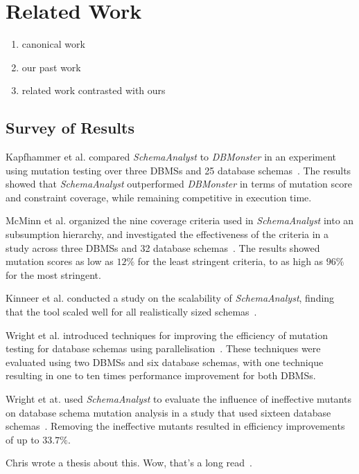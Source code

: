 \section{Related Work}
\begin{enumerate}
\item canonical work
\item our past work
\item related work contrasted with ours
\end{enumerate}

\subsection{Survey of Results}

Kapfhammer et al. compared \textit{SchemaAnalyst} to \textit{DBMonster}
in an experiment using mutation testing over three DBMSs and 25 database 
schemas~\cite{kapfhammer2013search}. The results showed that \textit{SchemaAnalyst} outperformed
\textit{DBMonster} in terms of mutation score and constraint coverage, while remaining competitive
in execution time.

McMinn et al. organized the nine coverage criteria used in \textit{SchemaAnalyst} into an subsumption
hierarchy, and investigated the effectiveness of the criteria in a study across
three DBMSs and 32 database schemas~\cite{mcminn2015effectiveness}.  The results showed mutation
scores as low as $12\%$ for the least stringent criteria, to as high as $96\%$ for the most stringent.

Kinneer et al. conducted a study on the scalability of \textit{SchemaAnalyst}, finding that the tool
scaled well for all realistically sized schemas~\cite{kinneer2015automatically}.

Wright et al. introduced techniques for improving the efficiency of mutation testing for database
schemas using parallelisation~\cite{wright2013efficient}. These techniques were evaluated using two
DBMSs and six database schemas, with one technique resulting in one to ten times performance
improvement for both DBMSs.

Wright et at. used \textit{SchemaAnalyst} to evaluate the influence of ineffective mutants on
database schema mutation analysis in a study that used sixteen database
schemas~\cite{wright2014impact}. Removing the ineffective mutants resulted in efficiency
improvements of up to $33.7\%$.

Chris wrote a thesis about this. Wow, that's a long read~\cite{wright2015mutation}.
